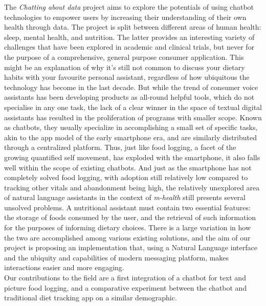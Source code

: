 
The \textit{Chatting about data} project aims to explore the potentials of using chatbot technologies to empower users by increasing their understanding of their own health through data. The project is split between different areas of human health: sleep, mental health, and nutrition. The latter provides an interesting variety of challenges that have been explored in academic and clinical trials, but never for the purpose of a comprehensive, general purpose consumer application. This might be an explanation of why it’s still not common to discuss your dietary habits with your favourite personal assistant, regardless of how ubiquitous the technology has become in the last decade. But while the trend of consumer voice assistants has been developing products as all-round helpful tools, which do not specialise in any one task, the lack of a clear winner in the space of textual digital assistants has resulted in the proliferation of programs with smaller scope. Known as chatbots, they usually specialize in accomplishing a small set of specific tasks, akin to the app model of the early smartphone era, and are similarly distributed through a centralized platform. Thus, just like food logging, a facet of the growing quantified self movement, has exploded with the smartphone, it also falls well within the scope of existing chatbots. And just as the smartphone has not completely solved food logging, with adoption still relatively low compared to tracking other vitals and abandonment being high, the relatively unexplored area of natural language assistants in the context of \textit{m-health} still presents several unsolved problems.
A nutritional assistant must contain two essential features: the storage of foods consumed by the user, and the retrieval of such information for the purposes of informing dietary choices. There is a large variation in how the two are accomplished among various existing solutions, and the aim of our project is proposing an implementation that, using a Natural Language interface and the ubiquity and capabilities of modern messaging platform, makes interactions easier and more engaging. \\
Our contributions to the field are a first integration of a chatbot for text and picture food logging, and a comparative experiment between the chatbot and traditional diet tracking app on a similar demographic.
